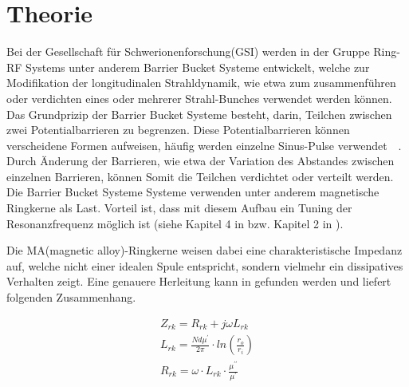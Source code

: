\section{Theorie}

Bei der Gesellschaft für Schwerionenforschung(GSI) werden in der Gruppe Ring-RF Systems unter anderem  Barrier Bucket Systeme entwickelt, welche zur Modifikation der longitudinalen Strahldynamik, wie etwa zum zusammenf\"uhren oder verdichten eines oder mehrerer Strahl-Bunches verwendet werden k\"onnen. 
Das Grundprizip der Barrier Bucket Systeme besteht, darin, Teilchen zwischen zwei Potentialbarrieren zu begrenzen. Diese Potentialbarrieren k\"onnen verscheidene Formen aufweisen, h\"aufig werden einzelne Sinus-Pulse verwendet~\citep{harzheim2016modeling}~\citep{lee1997particle}. Durch \"Anderung der Barrieren, wie etwa der Variation des Abstandes zwischen einzelnen Barrieren, k\"onnen Somit die Teilchen verdichtet oder verteilt werden.
Die Barrier Bucket Systeme Systeme verwenden unter anderem magnetische Ringkerne als Last. Vorteil ist, dass mit diesem Aufbau ein Tuning der Resonanzfrequenz m\"oglich ist (siehe Kapitel 4 in \citep{Klingbeil2015} bzw. Kapitel 2 in \citep{bast2017ba}).
\par
Die MA(magnetic alloy)-Ringkerne weisen dabei eine charakteristische Impedanz auf, welche nicht einer idealen Spule entspricht, sondern vielmehr ein dissipatives Verhalten zeigt. Eine genauere Herleitung kann in \citep{Klingbeil2015} gefunden werden und liefert folgenden Zusammenhang. 


\begin{align}
Z_{rk} = R_{rk} + j\omega L_{rk}\label{eq_01}\\
L_{rk} = \frac{Nd\mu^\prime}{2\pi}\cdot ln(\frac{r_o}{r_i})\label{eq_02}\\
R_{rk} = \omega\cdot L_{rk}\cdot\frac{\mu^{\prime\prime}}{\mu^{\prime}}\label{eq_03}
\end{align}



